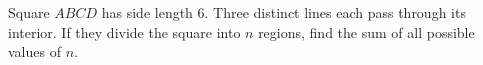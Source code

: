 Square $ABCD$ has side length $6$. Three distinct lines each pass through its interior. If they divide the square into $n$ regions, find the sum of all possible values of $n$.
